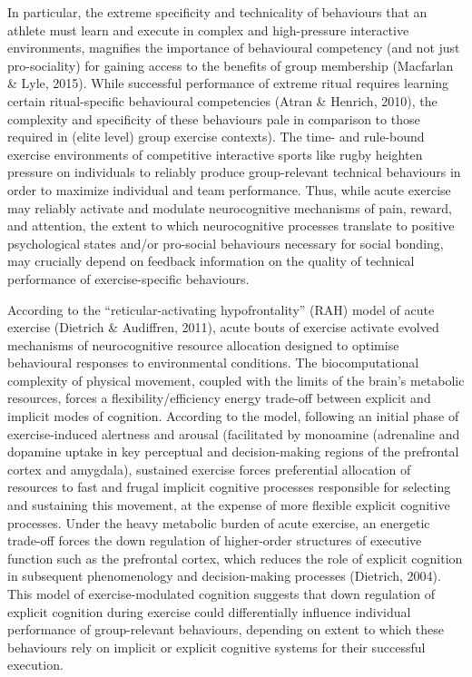 \documentclass[12pt]{report}
\begin{document}
In particular, the extreme specificity and technicality of behaviours that an athlete must learn and execute in complex and high-pressure interactive environments, magnifies the importance of behavioural competency (and not just pro-sociality) for gaining access to the benefits of group membership (Macfarlan & Lyle, 2015).  While successful performance of extreme ritual requires learning certain ritual-specific behavioural competencies (Atran & Henrich, 2010), the complexity and specificity of these behaviours pale in comparison to those required in (elite level) group exercise contexts). The time- and rule-bound exercise environments of competitive interactive sports like rugby heighten pressure on individuals to reliably produce group-relevant technical behaviours in order to maximize individual and team performance.  Thus, while acute exercise may reliably activate and modulate neurocognitive mechanisms of pain, reward, and attention, the extent to which neurocognitive processes translate to positive psychological states and/or pro-social behaviours necessary for social bonding, may crucially depend on feedback information on the quality of technical performance of exercise-specific behaviours.

According to the “reticular-activating hypofrontality” (RAH) model of acute exercise (Dietrich & Audiffren, 2011), acute bouts of exercise activate evolved mechanisms of neurocognitive resource allocation designed to optimise behavioural responses to environmental conditions.  The biocomputational complexity of physical movement, coupled with the limits of the brain’s metabolic resources, forces a flexibility/efficiency energy trade-off between explicit and implicit modes of cognition.  According to the model, following an initial phase of exercise-induced alertness and arousal (facilitated by monoamine (adrenaline and dopamine uptake in key perceptual and decision-making regions of the prefrontal cortex and amygdala), sustained exercise forces preferential allocation of resources to fast and frugal implicit cognitive processes responsible for selecting and sustaining this movement, at the expense of more flexible explicit cognitive processes.  Under the heavy metabolic burden of acute exercise, an energetic trade-off forces the down regulation of higher-order structures of executive function such as the prefrontal cortex, which reduces the role of explicit cognition in subsequent phenomenology and decision-making processes (Dietrich, 2004).   This model of exercise-modulated cognition suggests that down regulation of explicit cognition during exercise could differentially influence individual performance of group-relevant behaviours, depending on extent to which these behaviours rely on implicit or explicit cognitive systems for their successful execution.
\end{document}
